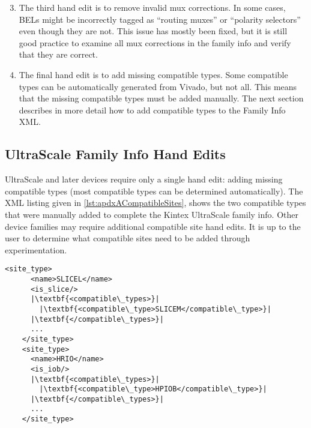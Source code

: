 \begin{enumerate}
\setcounter{enumi}{2}   	  	  	  
	  \item The third hand edit is to remove invalid mux corrections. In some
	  cases, BELs might be incorrectly tagged as ``routing muxes'' or ``polarity
	  selectors'' even though they are not. This issue has mostly been fixed, but
	  it is still good practice to examine all mux corrections in the
	  family info and verify that they are correct.
	  
	  \item The final hand edit is to add missing compatible types. Some compatible
	  types can be automatically generated from Vivado, but not all. This means
	  that the missing compatible types must be added manually. The next section
	  describes in more detail how to add compatible types to the Family Info XML.
\end{enumerate}

\subsection{UltraScale Family Info Hand Edits} \label{sec:ultrascaleHandEdits}

UltraScale and later devices require only a single hand edit: adding 
missing compatible types (most compatible types can be determined
automatically). The XML listing given in \autoref{lst:apdxACompatibleSites},
shows the two compatible types that were manually added to complete the Kintex
UltraScale family info. Other device families may require additional compatible
site hand edits. It is up to the user to determine what compatible sites need
to be added through experimentation.

\begin{lstlisting}[numbers=none, caption=Manually added compatible sites for
UltraScale devices, label=lst:apdxACompatibleSites] 
    <site_type>
      <name>SLICEL</name>
      <is_slice/>
      |\textbf{<compatible\_types>}|
        |\textbf{<compatible\_type>SLICEM</compatible\_type>}|
      |\textbf{</compatible\_types>}|
      ...
    </site_type>
    <site_type>
      <name>HRIO</name> 
      <is_iob/>
      |\textbf{<compatible\_types>}|
        |\textbf{<compatible\_type>HPIOB</compatible\_type>}|
      |\textbf{</compatible\_types>}|
      ...
    </site_type>
\end{lstlisting}  
